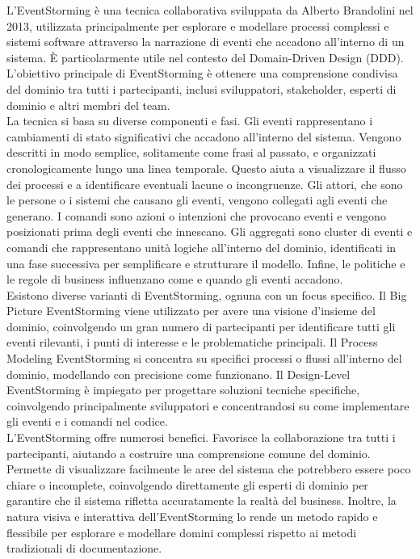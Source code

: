 L'EventStorming è una tecnica collaborativa sviluppata da Alberto Brandolini nel 2013, utilizzata principalmente per esplorare e modellare processi complessi e sistemi software attraverso la narrazione di eventi che accadono all'interno di un sistema. È particolarmente utile nel contesto del Domain-Driven Design (DDD). L'obiettivo principale di EventStorming è ottenere una comprensione condivisa del dominio tra tutti i partecipanti, inclusi sviluppatori, stakeholder, esperti di dominio e altri membri del team.\\

La tecnica si basa su diverse componenti e fasi. Gli eventi rappresentano i cambiamenti di stato significativi che accadono all'interno del sistema. Vengono descritti in modo semplice, solitamente come frasi al passato, e organizzati cronologicamente lungo una linea temporale. Questo aiuta a visualizzare il flusso dei processi e a identificare eventuali lacune o incongruenze. Gli attori, che sono le persone o i sistemi che causano gli eventi, vengono collegati agli eventi che generano. I comandi sono azioni o intenzioni che provocano eventi e vengono posizionati prima degli eventi che innescano. Gli aggregati sono cluster di eventi e comandi che rappresentano unità logiche all'interno del dominio, identificati in una fase successiva per semplificare e strutturare il modello. Infine, le politiche e le regole di business influenzano come e quando gli eventi accadono.\\

Esistono diverse varianti di EventStorming, ognuna con un focus specifico. Il Big Picture EventStorming viene utilizzato per avere una visione d'insieme del dominio, coinvolgendo un gran numero di partecipanti per identificare tutti gli eventi rilevanti, i punti di interesse e le problematiche principali. Il Process Modeling EventStorming si concentra su specifici processi o flussi all'interno del dominio, modellando con precisione come funzionano. Il Design-Level EventStorming è impiegato per progettare soluzioni tecniche specifiche, coinvolgendo principalmente sviluppatori e concentrandosi su come implementare gli eventi e i comandi nel codice.\\

L'EventStorming offre numerosi benefici. Favorisce la collaborazione tra tutti i partecipanti, aiutando a costruire una comprensione comune del dominio. Permette di visualizzare facilmente le aree del sistema che potrebbero essere poco chiare o incomplete, coinvolgendo direttamente gli esperti di dominio per garantire che il sistema rifletta accuratamente la realtà del business. Inoltre, la natura visiva e interattiva dell'EventStorming lo rende un metodo rapido e flessibile per esplorare e modellare domini complessi rispetto ai metodi tradizionali di documentazione.\\

